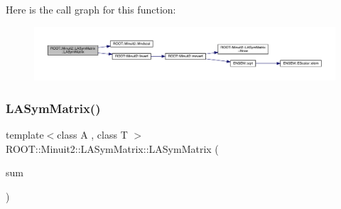 Here is the call graph for this function\+:
\nopagebreak
\begin{figure}[H]
\begin{center}
\leavevmode
\includegraphics[width=350pt]{d3/d72/classROOT_1_1Minuit2_1_1LASymMatrix_a0089b4055d0d08767d7072657b6f87d5_cgraph}
\end{center}
\end{figure}
\mbox{\label{classROOT_1_1Minuit2_1_1LASymMatrix_a50ecd9916b1ca8941c767d16dbdb9b65}} 
\subsubsection{\texorpdfstring{LASymMatrix()}{LASymMatrix()}\hspace{0.1cm}{\footnotesize\ttfamily [18/30]}}
{\footnotesize\ttfamily template$<$class A , class T $>$ \\
R\+O\+O\+T\+::\+Minuit2\+::\+L\+A\+Sym\+Matrix\+::\+L\+A\+Sym\+Matrix (\begin{DoxyParamCaption}\item[{const \mbox{\hyperlink{classROOT_1_1Minuit2_1_1ABObj}{A\+B\+Obj}}$<$ \mbox{\hyperlink{classROOT_1_1Minuit2_1_1sym}{sym}}, \mbox{\hyperlink{classROOT_1_1Minuit2_1_1ABSum}{A\+B\+Sum}}$<$ \mbox{\hyperlink{classROOT_1_1Minuit2_1_1ABObj}{A\+B\+Obj}}$<$ \mbox{\hyperlink{classROOT_1_1Minuit2_1_1sym}{sym}}, \mbox{\hyperlink{classROOT_1_1Minuit2_1_1MatrixInverse}{Matrix\+Inverse}}$<$ \mbox{\hyperlink{classROOT_1_1Minuit2_1_1sym}{sym}}, \mbox{\hyperlink{classROOT_1_1Minuit2_1_1ABObj}{A\+B\+Obj}}$<$ \mbox{\hyperlink{classROOT_1_1Minuit2_1_1sym}{sym}}, \mbox{\hyperlink{classROOT_1_1Minuit2_1_1LASymMatrix}{L\+A\+Sym\+Matrix}}, T $>$, T $>$, T $>$, \mbox{\hyperlink{classROOT_1_1Minuit2_1_1ABObj}{A\+B\+Obj}}$<$ \mbox{\hyperlink{classROOT_1_1Minuit2_1_1sym}{sym}}, A, T $>$ $>$, T $>$ \&}]{sum }\end{DoxyParamCaption})\hspace{0.3cm}{\ttfamily [inline]}}

